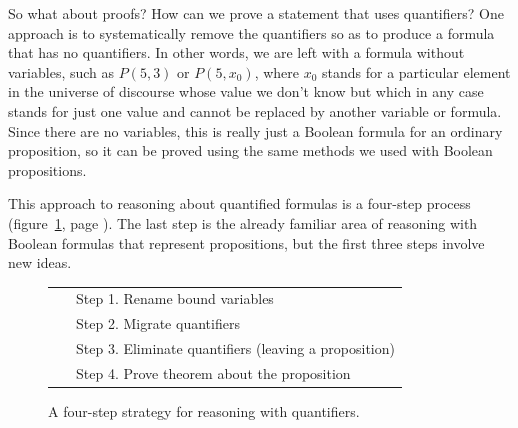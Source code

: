 {{So what about proofs? How can we prove a statement that uses quantifiers?
One approach is to systematically
remove the quantifiers so as to produce a formula that has no quantifiers.
In other words, we
are left with a formula without variables, such as $P(5,3)$ or $P(5,x_0)$, where
$x_0$ stands for a particular element in the universe of discourse whose value
we don't know but which in any case stands for just one value and cannot
be replaced by another variable or formula.
Since there are no variables, this is really just a Boolean formula
for an ordinary proposition,
so it can be proved using the same methods we used
with Boolean propositions.

This approach to reasoning about quantified formulas is a four-step process
(figure~\ref{fig:four-step-quantifier-reasoning}, page \pageref{fig:four-step-quantifier-reasoning}).
The last step is the already familiar area of reasoning
with Boolean formulas that represent propositions,
but the first three steps involve new ideas.

\begin{figure}
\begin{center}
\begin{tabular} {ll}
~&Step 1. Rename bound variables \\
~&Step 2. Migrate quantifiers \\
~&Step 3. Eliminate quantifiers (leaving a proposition) \\
~&Step 4. Prove theorem about the proposition \\
\end{tabular}
\label{four-step-strategy-quantifiers}
\end{center}
\caption{A four-step strategy for reasoning with quantifiers.}
\label{fig:four-step-quantifier-reasoning}
\end{figure}

}}
